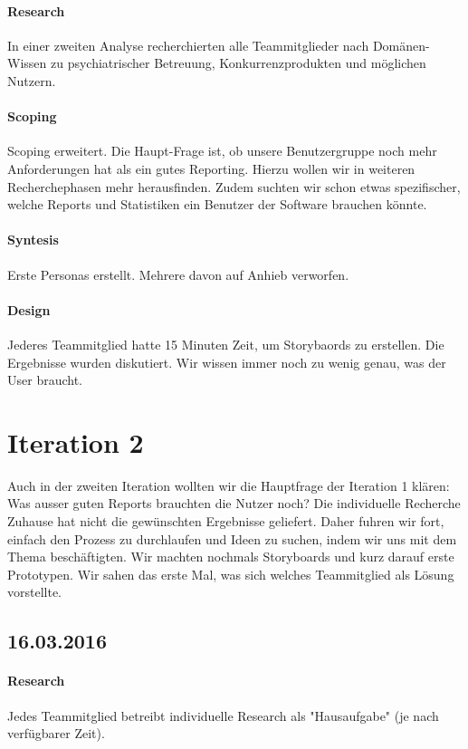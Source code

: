\documentclass[a4paper]{scrreprt}
\begin{document}
\paragraph{Research}
In einer zweiten Analyse recherchierten alle Teammitglieder nach Domänen-Wissen zu psychiatrischer Betreuung, Konkurrenzprodukten und möglichen Nutzern.


\paragraph{Scoping}
Scoping erweitert. Die Haupt-Frage ist, ob unsere Benutzergruppe noch mehr Anforderungen hat als ein gutes Reporting. Hierzu wollen wir in weiteren Recherchephasen mehr herausfinden. Zudem suchten wir schon etwas spezifischer, welche Reports und Statistiken ein Benutzer der Software brauchen könnte.


\paragraph{Syntesis}
Erste Personas erstellt. Mehrere davon auf Anhieb verworfen.


\paragraph{Design}
Jederes Teammitglied hatte 15 Minuten Zeit, um Storybaords zu erstellen. Die Ergebnisse wurden diskutiert. Wir wissen immer noch zu wenig genau, was der User braucht.


\section{Iteration 2}
Auch in der zweiten Iteration wollten wir die Hauptfrage der Iteration 1 klären: Was ausser guten Reports brauchten die Nutzer noch? Die individuelle Recherche Zuhause hat nicht die gewünschten Ergebnisse geliefert. Daher fuhren wir fort, einfach den Prozess zu durchlaufen und Ideen zu suchen, indem wir uns mit dem Thema beschäftigten. Wir machten nochmals Storyboards und kurz darauf erste Prototypen. Wir sahen das erste Mal, was sich welches Teammitglied als Lösung vorstellte.

\subsection*{16.03.2016}
\paragraph{Research}
Jedes Teammitglied betreibt individuelle Research als "Hausaufgabe" (je nach verfügbarer Zeit).
\end{document}
